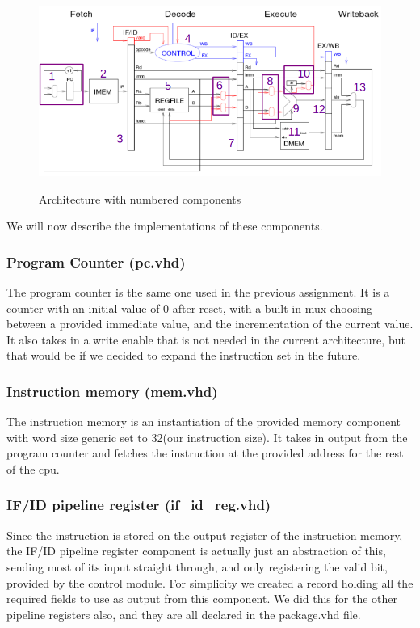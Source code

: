 \documentclass[11pt]{report}
\begin{document}
\begin{figure}[htbp]
  \centering
  \includegraphics[width=0.95\linewidth]{toplevelmarked.png} \\
  \caption{Architecture with numbered components}
  \label{fig:archnumbered}
\end{figure}
	
We will now describe the implementations of these components.
\subsubsection*{Program Counter (pc.vhd)}
The program counter is the same one used in the previous assignment. 
It is a counter with an initial value of 0 after reset, with a built in
mux choosing between a provided immediate value, and the incrementation of
the current value. It also takes in a write enable that is not needed in
the current architecture, but that would be if we decided to expand the 
instruction set in the future.

\subsubsection*{Instruction memory (mem.vhd)}
The instruction memory is an instantiation of the provided memory component
with word size generic set to 32(our instruction size). It takes in
output from the program counter and fetches the instruction at the provided
address for the rest of the cpu.
\subsubsection*{IF/ID pipeline register (if\_id\_reg.vhd)}
Since the instruction is stored on the output register of the instruction memory,
the IF/ID pipeline register component is actually just an abstraction of this, sending 
most of its input straight through, and only registering the valid bit, provided by
the control module. For simplicity we created a record holding all the required fields
to use as output from this component. We did this for the other pipeline registers
also, and they are all declared in the package.vhd file.
\end{document}
